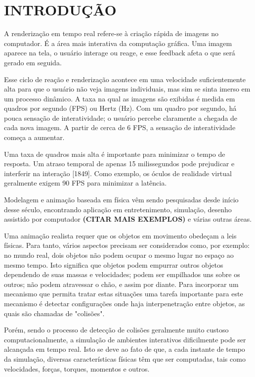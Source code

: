 \chapter{INTRODUÇÃO}

A renderização em tempo real refere-se à criação rápida de imagens no computador. É a área mais interativa da computação gráfica. Uma imagem aparece na tela, o usuário interage ou reage, e esse feedback afeta o que será gerado em seguida.

Esse ciclo de reação e renderização acontece em uma velocidade suficientemente alta para que o usuário não veja imagens individuais, mas sim se sinta imerso em um processo dinâmico. A taxa na qual as imagens são exibidas é medida em quadros por segundo (FPS) ou Hertz (Hz). Com um quadro por segundo, há pouca sensação de interatividade; o usuário percebe claramente a chegada de cada nova imagem. A partir de cerca de 6 FPS, a sensação de interatividade começa a aumentar.

Uma taxa de quadros mais alta é importante para minimizar o tempo de resposta. Um atraso temporal de apenas 15 milissegundos pode prejudicar e interferir na interação [1849]. Como exemplo, os óculos de realidade virtual geralmente exigem 90 FPS para minimizar a latência.

Modelagem e animação baseada em física vêm sendo pesquisadas desde início desse século, encontrando aplicação em entretenimento, simulação, desenho assistido por computador \textbf{(CITAR MAIS EXEMPLOS)} e várias outras áreas.

Uma animação realista requer que os objetos em movimento obedeçam a leis físicas. Para tanto, vários aspectos precisam ser considerados como, por exemplo: no mundo real, dois objetos não podem ocupar o mesmo lugar no espaço ao mesmo tempo. Isto significa que objetos podem empurrar outros objetos dependendo de suas massas e velocidades; podem ser empilhados uns sobre os outros; não podem atravessar o chão, e assim por diante. Para incorporar um mecanismo que permita tratar estas situações uma tarefa importante para este mecanismo é detectar configurações onde haja interpenetração entre objetos, as quais são chamadas de "colisões". 

Porém, sendo o processo de detecção de colisões geralmente muito custoso computacionalmente, a simulação de ambientes interativos dificilmente pode ser alcançada em tempo real. Isto se deve ao fato de que, a cada instante de tempo da simulação, diversas características físicas têm que ser computadas, tais como velocidades, forças, torques, momentos e outros.

